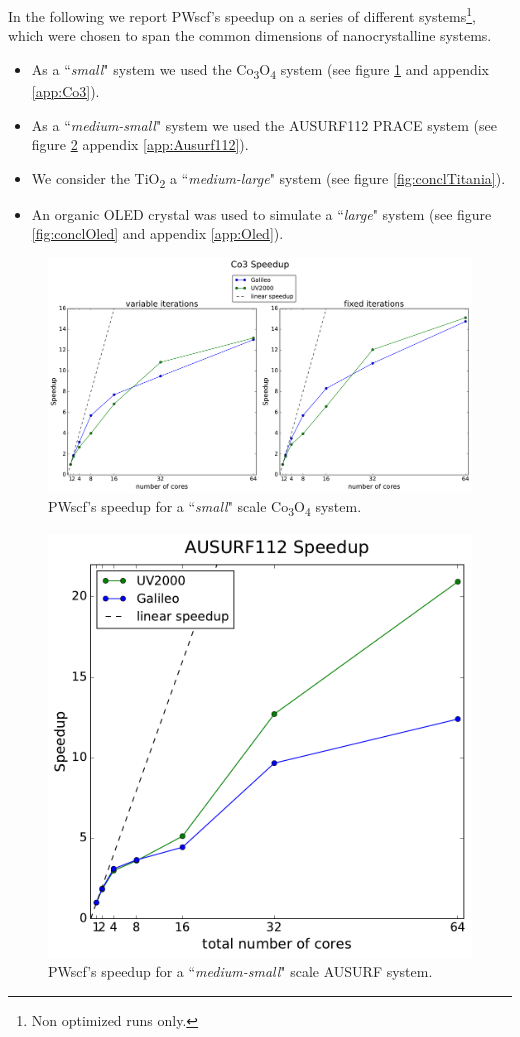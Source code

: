 \documentclass[a4paper,12pt]{article}
\newcommand\CO{Co\textsubscript{3}O\textsubscript{4} }
\begin{document}
In the following we report PWscf's speedup on a series of different systems\footnote{Non optimized runs only.}, which were chosen to span the common dimensions of nanocrystalline systems.

\begin{itemize}
	\item As a ``\textit{small}" system we used the \CO system (see figure \ref{fig:conclCo3} and appendix \ref{app:Co3}).
	\item As a ``\textit{medium-small}" system we used the AUSURF112 PRACE system\cite{prace} (see figure \ref{fig:conclAusurf} appendix \ref{app:Ausurf112}).
	\item We consider the TiO\textsubscript{2} a ``\textit{medium-large}" system (see figure \ref{fig:conclTitania}).
	\item An organic OLED crystal was used to simulate a ``\textit{large}" system (see figure \ref{fig:conclOled} and appendix \ref{app:Oled}).
\end{itemize}

\begin{figure}[hhh!]
\centerline{ \includegraphics[width=1.\linewidth]{concl_co3.pdf}	}
	\caption{PWscf's speedup for a ``\textit{small}" scale \CO system.}
	\label{fig:conclCo3}
\end{figure}


\begin{figure}[hhh!]
\centerline{ \includegraphics[width=0.5\linewidth]{concl_ausurf.pdf}	}
	\caption{PWscf's speedup for a ``\textit{medium-small}" scale AUSURF system.}
	\label{fig:conclAusurf}
\end{figure}
\newpage
\end{document}
